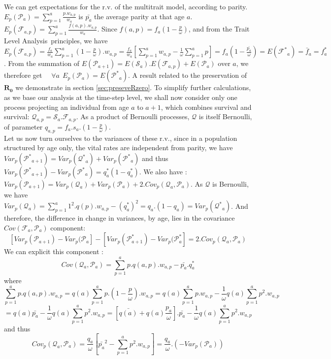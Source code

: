 \documentclass[10pt,a4paper]{article}
\newcommand{\TLA}{Trait Level Analysis}
\begin{document}
We can get expectations for the r.v. of the multitrait model, according to parity. $E_{p}(\mathcal{P}_a)=\sum_{p=1}^{a} \frac{p.w_{a,p}}{w_{a}}$ is $\bar{p_a}$ the average parity at that age $a$. $E_{p}(\mathcal{F}_{a,p})=\sum_{p=1}^{a} \frac{f(a,p).w_{a,p}}{w_{a}}$.
Since $f(a,p)=f_{a}(1-\frac{p}{\omega})$, and from the \TLA\ principles, we have $E_{p}(\mathcal{F}_{a,p})=\frac{f_{a}}{w_{a}}\sum_{p=1}^{a} (1-\frac{p}{\omega}).w_{a,p}=\frac{f_{a}}{w_{a}}\left[\sum_{p=1}^{a} w_{a,p}  - \frac{1}{\omega}\sum_{p=1}^{a} p \right]=f_{a}(1- \frac{\bar{p_a}}{\omega})= E(\mathcal{F^{*}}_{a})=\bar{f}_{a}=f^{*}_{a}$.
From the summation of $E(\mathcal{P}_{a+1})= E(\mathcal{S}_{a}).E(\mathcal{F}_{a,p})+ E(\mathcal{P}_a)$ over $a$, we therefore get 
$\quad \forall a~~E_{p}(\mathcal{P}_{a})=E(\mathcal{P^*}_{a})$. A result related to the preservation of $\mathbf{R_0}$ we demonstrate in section \ref{sec:preseveRzero}. To simplify further calculations, as we base our analysis at the time-step level, we shall now consider only one process projecting an individual from age $a$ to $a+1$, which combines survival and survival: $\mathcal{Q}_{a,p} =\mathcal{S}_{a}.\mathcal{F}_{a,p}$. As a product of Bernoulli processes, $\mathcal{Q}$ is itself Bernoulli, of parameter $q_{a,p}=f_{a}.s_{a}.(1-\frac{p}{\omega})$.\\

Let us now turn ourselves to the variances of these r.v., since in a population structured by age only, the vital rates are independent from parity, we have $Var_{p}(\mathcal{P^*}_{a+1}) = Var_{p}(\mathcal{Q^*}_{a}) + Var_{p}(\mathcal{P^*}_a)$ and thus $Var_{p}(\mathcal{P^*}_{a+1}) -Var_{p}(\mathcal{P^*}_a) =q_{a}^{*}(1-q_{a}^{*})  $.
We also have : $Var_{p}(\mathcal{P}_{a+1}) = Var_{p}(\mathcal{Q}_{a}) + Var_{p}(\mathcal{P}_a)+2.Cov_{p}(\mathcal{Q}_{a},\mathcal{P}_a)$.
As $\mathcal{Q}$ is Bernoulli, we have $Var_{p}(\mathcal{Q}_{a})=\sum_{p=1}^{a} 1^{2}.q(p).w_{a,p}- (q^{*}_{a})^2=q_{a}.(1-q_{a})=Var_{p}(\mathcal{Q^*}_{a})$. And therefore, the difference in change in variances, by age, lies in the covariance $Cov(\mathcal{F}_{a},\mathcal{P}_a)$ component:
\[
\left[ Var_{p}(\mathcal{P}_{a+1}) - Var_{p}(\mathcal{P}_{a}\right] - \left[ Var_{p}(\mathcal{P}^{*}_{a+1}) - Var_{p}(\mathcal{P}^{*}_{a}\right] = 2.Cov_{p}(\mathcal{Q}_{a},\mathcal{P}_a)
\]
We can explicit this component :
\[
Cov(\mathcal{Q}_{a},\mathcal{P}_a)=\sum_{p=1}^{a}p.q(a,p).w_{a,p} - \bar{p_a}.q_{a}^{*}
\] where 
\[
\sum_{p=1}^{a}p.q(a,p).w_{a,p} =q(a)\sum_{p=1}^{a}p.(1-\frac{p}{\omega}).w_{a,p} =q(a)\sum_{p=1}^{a}p.w_{a,p} - \frac{1}{\omega}q(a)\sum_{p=1}^{a}p^{2}.w_{a,p} 
\] 
\[
=q(a)\bar{p_{a}} - \frac{1}{\omega}q(a)\sum_{p=1}^{a}p^{2}.w_{a,p} 
=[\bar{q(a)}+q(a)\frac{p_{a}}{\omega}].\bar{p_{a}} - \frac{1}{\omega}q(a)\sum_{p=1}^{a}p^{2}.w_{a,p} 
\]
and thus
\[
 Cov_{p}(\mathcal{Q}_{a},\mathcal{P}_a)= \frac{q_{a}}{\omega} \left[  \bar{p_{a}}^{2} - \sum_{p=1}^{a}p^{2}.w_{a,p} \right] = \frac{q_{a}}{\omega}.(-Var_{p}(\mathcal{P}_{a})) 
\]
\end{document}
